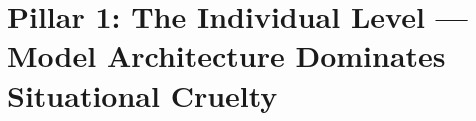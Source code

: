 \section{Pillar 1: The Individual Level --- Model Architecture Dominates Situational Cruelty}
\label{sec:pillar1_individual}

